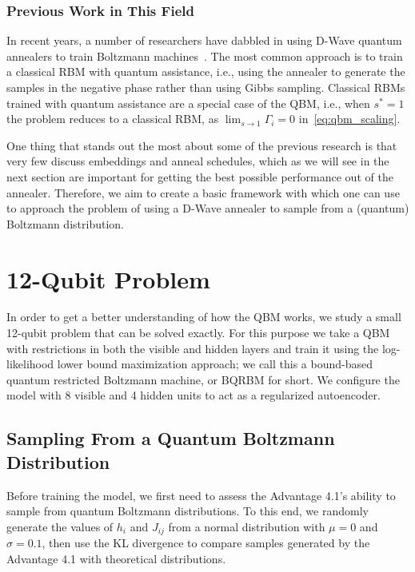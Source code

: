 \subsubsection{Previous Work in This Field}
In recent years, a number of researchers have dabbled in using D-Wave quantum annealers to train Boltzmann machines~\cite{adachi_2015,benedetti_2016,anschuetz_2019,wiebe_2019,rocutto_2020,dixit_2021,ilmo_2021,wilson_2021,xu_2021}.
The most common approach is to train a classical RBM with quantum assistance, i.e., using the annealer to generate the samples in the negative phase rather than using Gibbs sampling.
Classical RBMs trained with quantum assistance are a special case of the QBM, i.e., when \( s^* = 1 \) the problem reduces to a classical RBM, as \( \lim_{s\rightarrow 1} \Gamma_i = 0 \) in~\cref{eq:qbm_scaling}.

One thing that stands out the most about some of the previous research is that very few discuss embeddings and anneal schedules, which as we will see in the next section are important for getting the best possible performance out of the annealer.
Therefore, we aim to create a basic framework with which one can use to approach the problem of using a D-Wave annealer to sample from a (quantum) Boltzmann distribution.

\section{12-Qubit Problem}\label{sec:qbm_12_qubit_problem}
In order to get a better understanding of how the QBM works, we study a small 12-qubit problem that can be solved exactly.
For this purpose we take a QBM with restrictions in both the visible and hidden layers and train it using the log-likelihood lower bound maximization approach; we call this a bound-based quantum restricted Boltzmann machine, or BQRBM for short.
We configure the model with 8 visible and 4 hidden units to act as a regularized autoencoder.

\subsection{Sampling From a Quantum Boltzmann Distribution}
Before training the model, we first need to assess the Advantage 4.1's ability to sample from quantum Boltzmann distributions.
To this end, we randomly generate the values of \( h_i \) and \( J_{ij} \) from a normal distribution with \( \mu = 0 \) and \( \sigma = 0.1 \), then use the KL divergence to compare samples generated by the Advantage 4.1 with theoretical distributions.

